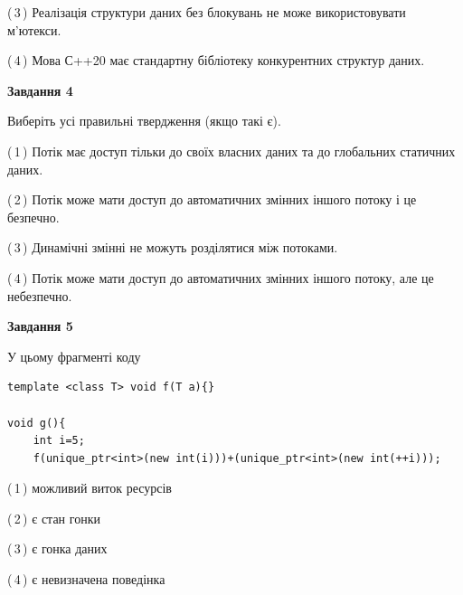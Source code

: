 \documentclass[12pt, ukrainian]{article}
\begin{document}
\begin {large}
{(\,3\,) Реалізація структури даних без блокувань не може використовувати м’ютекси.%

(\,4\,) Мова С++20 має стандартну бібліотеку конкурентних структур даних.%



\begin{center}
\textbf{Завдання 4}
\end{center}
Виберіть усі правильні твердження (якщо такі є).\par
\vspace{2mm}

(\,1\,) Потік має доступ тільки до своїх власних даних та до глобальних статичних даних.%

(\,2\,) Потік може мати доступ до автоматичних змінних іншого потоку і це безпечно.%

(\,3\,) Динамічні змінні не можуть розділятися між потоками.%

(\,4\,) Потік може мати доступ до автоматичних змінних іншого потоку, але це небезпечно.%



\begin{center}
\textbf{Завдання 5}
\end{center}
У цьому фрагменті коду
\begin{verbatim}
template <class T> void f(T a){}

void g(){
    int i=5;
    f(unique_ptr<int>(new int(i)))+(unique_ptr<int>(new int(++i)));
\end{verbatim}
(\,1\,) можливий виток ресурсів%

(\,2\,) є стан гонки%

(\,3\,) є гонка даних%

(\,4\,) є невизначена поведінка%


}
\end {large}
\end{document}
